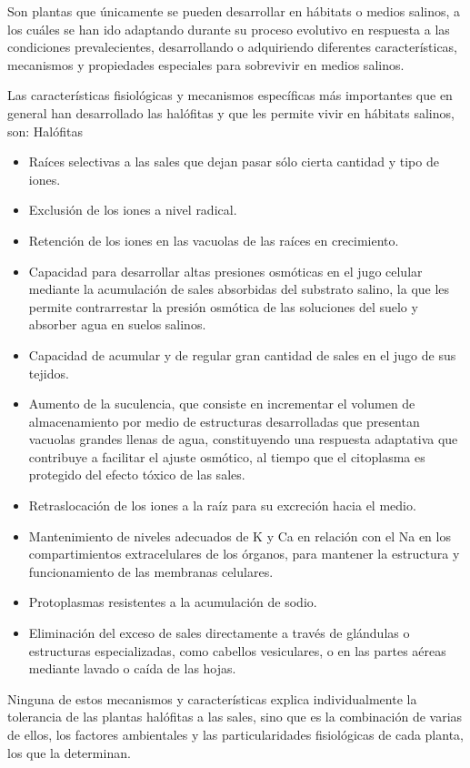 \begin{definition}[Halófitas]
    Son plantas que únicamente se pueden desarrollar en hábitats o medios salinos, a los cuáles se han ido adaptando durante su proceso evolutivo en respuesta a las condiciones prevalecientes, desarrollando o adquiriendo diferentes características, mecanismos y propiedades especiales para sobrevivir en medios salinos.
\end{definition}
Las características fisiológicas y mecanismos específicas más importantes que en general han desarrollado las halófitas y que les permite vivir en hábitats salinos, son: Halófitas
\begin{itemize}
    \item Raíces selectivas a las sales que dejan pasar sólo cierta cantidad y tipo de iones.
    \item Exclusión de los iones a nivel radical.
    \item Retención de los iones en las vacuolas de las raíces en crecimiento.
    \item Capacidad para desarrollar altas presiones osmóticas en el jugo celular mediante la acumulación de sales absorbidas del substrato salino, la que les permite contrarrestar la presión osmótica de las soluciones del suelo y absorber agua en suelos salinos.
    \item Capacidad de acumular y de regular gran cantidad de sales en el jugo de sus tejidos.
    \item Aumento de la suculencia, que consiste en incrementar el volumen de almacenamiento por medio de estructuras desarrolladas que presentan vacuolas grandes llenas de agua, constituyendo una respuesta adaptativa que contribuye a facilitar el ajuste osmótico, al tiempo que el citoplasma es protegido del efecto tóxico de las sales.
    \item Retraslocación de los iones a la raíz para su excreción hacia el medio.
    \item Mantenimiento de niveles adecuados de K y Ca en relación con el Na en los compartimientos extracelulares de los órganos, para mantener la estructura y funcionamiento de las membranas celulares.
    \item Protoplasmas resistentes a la acumulación de sodio.
    \item Eliminación del exceso de sales directamente a través de glándulas o estructuras especializadas, como cabellos vesiculares, o en las partes aéreas mediante lavado o caída de las hojas.    
\end{itemize}
Ninguna de estos mecanismos y características explica individualmente la tolerancia de las plantas halófitas a las sales, sino que es la combinación de varias de ellos, los factores ambientales y las particularidades fisiológicas de cada planta, los que la determinan.

